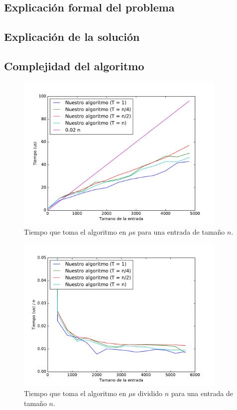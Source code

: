 \subsection{Explicación formal del problema}

\subsection{Explicación de la solución}

\subsection{Complejidad del algoritmo}


\begin{figure}[H]
 \centering
	\includegraphics[width=0.9\textwidth]{img/tiempos/genkidama1.pdf}
	\caption{\footnotesize Tiempo que toma el algoritmo en $\mu$s para una entrada de tamaño $n$.}
	\label{fig:genkidama-tiempos1}
\end{figure}


\begin{figure}[H]
 \centering
	\includegraphics[width=0.9\textwidth]{img/tiempos/genkidama2.pdf}
	\caption{\footnotesize Tiempo que toma el algoritmo en $\mu$s dividido $n$ para una entrada de tamaño $n$.}
	\label{fig:genkidama-tiempos2}
\end{figure}

